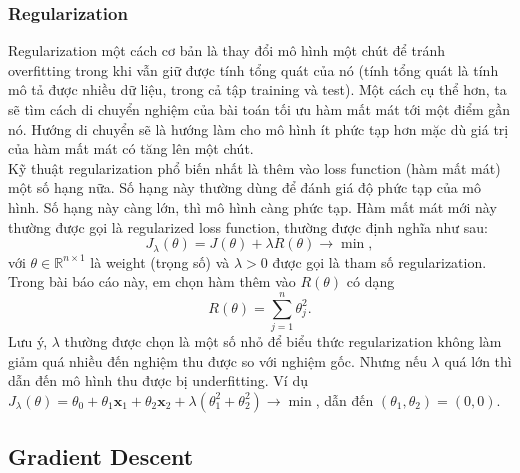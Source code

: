 \documentclass[]{article}
\begin{document}
\subsubsection{Regularization}
Regularization một cách cơ bản là thay đổi mô hình một chút để tránh overfitting trong khi vẫn giữ được tính tổng quát của nó (tính tổng quát là tính mô tả được nhiều dữ liệu, trong cả tập training và test). Một cách cụ thể hơn, ta sẽ tìm cách di chuyển nghiệm của bài toán tối ưu hàm mất mát tới một điểm gần nó. Hướng di chuyển sẽ là hướng làm cho mô hình ít phức tạp hơn mặc dù giá trị của hàm mất mát có tăng lên một chút.
\\
Kỹ thuật regularization phổ biến nhất là thêm vào loss function (hàm mất mát) một số hạng nữa. Số hạng này thường dùng để đánh giá độ phức tạp của mô hình. Số hạng này càng lớn, thì mô hình càng phức tạp. Hàm mất mát mới này thường được gọi là regularized loss function, thường được định nghĩa như sau:
$$J_{\lambda}(\theta) = J(\theta) + \lambda R(\theta)\to \min,$$
với $\theta\in \mathbb{R}^{n\times 1}$ là weight (trọng số) và $\lambda>0$ được gọi là tham số regularization. Trong bài báo cáo này, em chọn hàm thêm vào $R(\theta)$ có dạng
$$R(\theta)=\sum_{j=1}^{n}\theta_j^2.$$
Lưu ý, $\lambda$ thường được chọn là một số nhỏ để biểu thức regularization không làm giảm quá nhiều đến nghiệm thu được so với nghiệm gốc. Nhưng nếu $\lambda$ quá lớn thì dẫn đến mô hình thu được bị underfitting. Ví dụ $J_{\lambda}(\theta)=\theta_0+\theta_1\textbf{x}_1 +\theta_2\textbf{x}_2+\lambda (\theta_1^2+\theta_2^2)\to \min$, dẫn đến $(\theta_1, \theta_2)=(0, 0)$.

\subsection{Gradient Descent}
\end{document}

